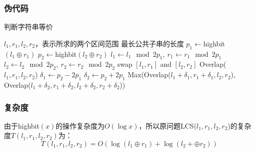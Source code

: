\documentclass[UTF8]{ctexart}
\begin{document}
\subsubsection*{伪代码}
\begin{algorithm}
    \caption{判断字符串等价}
    \begin{algorithmic}[1]
        \Require $l_1, r_1, l_2, r_2$，表示所求的两个区间范围
        \Ensure 最长公共子串的长度
            \State $p_1 \gets$highbit$(l_1\oplus r_1)$
            \State $p_2 \gets$highbit$(l_2\oplus r_2)$
            \State $l_1 \gets l_1 \mod 2p_1,\ r_1\gets r_1\mod 2p_1$
            \State $l_2 \gets l_2 \mod 2p_2,\ r_2\gets r_2\mod 2p_2$
            \If{$\Sigma[p_1] > \Sigma[p_2]$}
                \State swap $[l_1, r_1]$ and $[l_2, r_2]$
            \EndIf
                \State \Return Overlap($l_1, r_1, l_2, r_2$)
            \Else
                \State $\delta_1\gets p_2-2p_1$
                \State $\delta_2\gets p_2+2p_1$
                \State \Return Max(Overlap($l_1+\delta_1, r_1+\delta_1, l_2, r_2$), Overlap($l_1+\delta_2, r_1+\delta_2, l_2+\delta_2, r_2+\delta_2$))
            \EndIf
        \EndFunction
    \end{algorithmic}
\end{algorithm}

\subsubsection*{复杂度}

由于highbit$(x)$的操作复杂度为$O(\log x)$，所以原问题LCS($l_1, r_1, l_2, r_2$)的复杂度$T(l_1, r_1, l_2, r_2)$为：
$$T(l_1, r_1, l_2, r_2)=O\left(\log\left(l_1\oplus r_1\right)+\log\left(l_2+\oplus r_2\right)\right)$$
\end{document}
